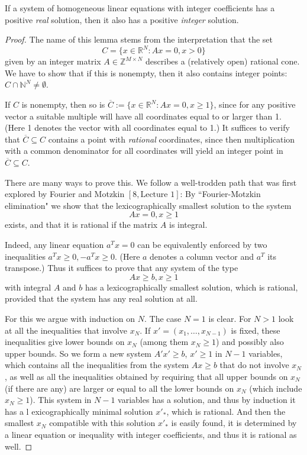 \begin{lemma}
  \label{cone_lemma}
  If a system of homogeneous linear equations with integer
  coefficients has a positive \emph{real} solution, then it also has a positive
  \emph{integer} solution.
\end{lemma}
\begin{proof}
   The name of this lemma stems from the interpretation that the set
  \[
  C = \{x \in \mathbb{R}^N : Ax = 0, x > 0\}
  \]
  given by an integer matrix \( A \in \mathbb{Z}^{M \times N} \) describes a (relatively open) rational
  cone. We have to show that if this is nonempty, then it also contains integer
  points: \( C \cap \mathbb{N}^N \neq \emptyset \).

  If \( C \) is nonempty, then so is \(\overline{C} := \{x \in \mathbb{R}^N : Ax = 0, x \geq 1\}\), since
  for any positive vector a suitable multiple will have all coordinates equal to or
  larger than 1. (Here 1 denotes the vector with all coordinates equal to 1.)
  It suffices to verify that \( \overline{C} \subseteq C \) contains a point with \emph{rational} coordinates,
  since then multiplication with a common denominator for all coordinates
  will yield an integer point in \( \overline{C} \subseteq C \).

  There are many ways to prove this. We follow a well-trodden path that was
  first explored by Fourier and Motzkin \([8, \text{Lecture 1}]\): By ``Fourier-Motzkin
  elimination" we show that the lexicographically smallest solution to the
  system
  \[
  Ax = 0, x \geq 1
  \]
  exists, and that it is rational if the matrix \( A \) is integral.

  Indeed, any linear equation \( a^T x = 0 \) can be equivalently enforced by two
  inequalities \( a^T x \geq 0, -a^T x \geq 0 \). (Here \( a \) denotes a column vector and
  \( a^T \) its transpose.) Thus it suffices to prove that any system of the type
  \[
  Ax \geq b, x \geq 1
  \]
  with integral \( A \) and \( b \) has a lexicographically smallest solution, which is
  rational, provided that the system has any real solution at all.

  For this we argue with induction on \( N \). The case \( N = 1 \) is clear. For \( N > 1 \)
  look at all the inequalities that involve \( x_N \). If \( x' = (x_1, \ldots, x_{N-1}) \) is fixed,
  these inequalities give lower bounds on \( x_N \) (among them \( x_N \geq 1 \)) and
  possibly also upper bounds. So we form a new system \( A' x' \geq b \), \( x' \geq 1 \)
  in \( N-1 \) variables, which contains all the inequalities from the system
  \( Ax \geq b \) that do not involve \( x_N \), as well as all the inequalities obtained
  by requiring that all upper bounds on \( x_N \) (if there are any) are larger or
  equal to all the lower bounds on \( x_N \) (which include \( x_N \geq 1 \)). This system
  in \( N-1 \) variables has a solution, and thus by induction it has a l
  exicographically minimal solution \( x'_*\), which is rational. And then the smallest
  \( x_N \) compatible with this solution \( x'_*\) is easily found, it is determined by a
  linear equation or inequality with integer coefficients, and thus it is rational as well.
\end{proof}


